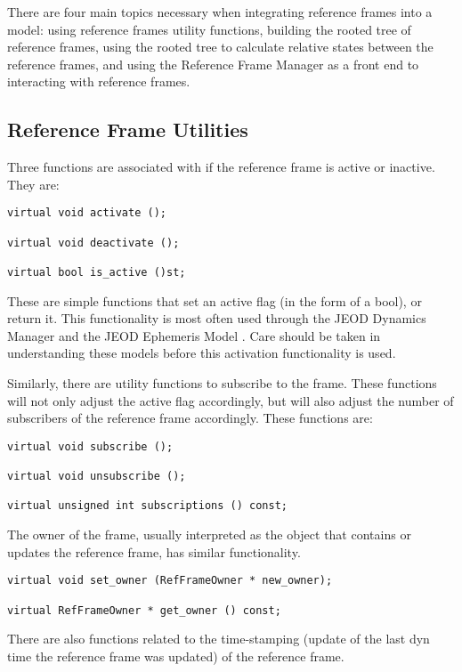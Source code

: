 There are four main topics necessary when integrating reference frames into
a model: using reference frames utility functions,
building the rooted tree of reference frames, using the rooted
tree to calculate relative states between the reference frames, and
using the Reference Frame Manager as a front end to interacting
with reference frames.

\subsection{Reference Frame Utilities}
Three functions are associated with if the reference frame
is active or inactive. They are:

\begin{verbatim}
virtual void activate ();

virtual void deactivate ();

virtual bool is_active ()st;
\end{verbatim}

These are simple functions that set an active flag (in the form of
a bool), or return it. This functionality is most often used through
the JEOD Dynamics Manager \cite{dynenv:DYNMANAGER} and the JEOD
Ephemeris Model \cite{dynenv:EPHEMERIDES}. Care should be taken
in understanding these models before this activation functionality
is used.

Similarly, there are utility functions to subscribe to the frame.
These functions will not only adjust the active flag accordingly, but
will also adjust the number of subscribers of the reference frame
accordingly. These functions are:

\begin{verbatim}
virtual void subscribe ();

virtual void unsubscribe ();

virtual unsigned int subscriptions () const;
\end{verbatim}

The owner of the frame, usually interpreted as the object that
contains or updates the reference frame, has similar functionality.

\begin{verbatim}
virtual void set_owner (RefFrameOwner * new_owner);

virtual RefFrameOwner * get_owner () const;
\end{verbatim}

There are also functions related to the time-stamping (update of the last
dyn time \cite{dynenv:TIME} the reference frame was updated)
of the reference frame.

